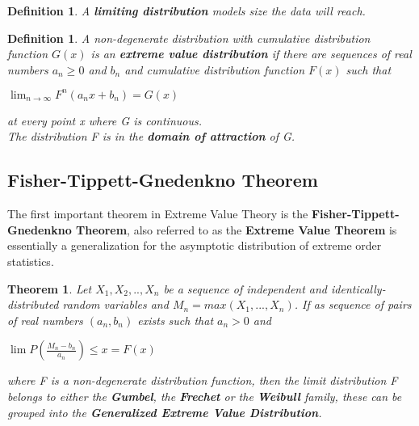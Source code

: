 \documentclass[11pt,a4paper]{article}
\theoremstyle{plain}
\newtheorem{thm}[fact]{Theorem}
\newtheorem{de}[fact]{Definition}
\begin{document}
\begin{de}
A \textbf{limiting distribution} models size  the data will reach.
\end{de}

\begin{de} 
A non-degenerate distribution with cumulative distribution function $G(x)$ is an \textbf{extreme value distribution} if there are sequences of real numbers $a_n\geq 0$ and $b_n$ and cumulative distribution function $F(x)$ such that
\begin{center}
$\lim_{n\rightarrow \infty} F^n(a_nx+b_n)=G(x)$
\end{center}
at every point x where G is continuous. \\
The distribution F is in the \textbf{domain of attraction} of G.
\end{de}


\subsection{Fisher-Tippett-Gnedenkno Theorem}
The first important theorem in Extreme Value Theory is the \textbf{Fisher-Tippett-Gnedenkno Theorem}, also referred to as the \textbf{Extreme Value Theorem} is essentially a  generalization for the asymptotic distribution of extreme order statistics.
\begin{thm}
Let $X_1,X_2,..,X_n$ be a sequence of independent and identically-distributed random variables and $M_n=max({X_1,...,X_n})$. If as sequence of pairs of real numbers $(a_n,b_n)$ exists such that $a_n>0$ and
\begin{center}
$\lim{P(\frac{M_n-b_n}{a_n})\leq x}=F(x)$
\end{center}
where F is a non-degenerate distribution function, then the limit distribution F belongs to either the \textbf{Gumbel}, the \textbf{Frechet} or the \textbf{Weibull} family, these can be grouped into the \textbf{Generalized Extreme Value Distribution}.
\end{thm}
\end{document}
